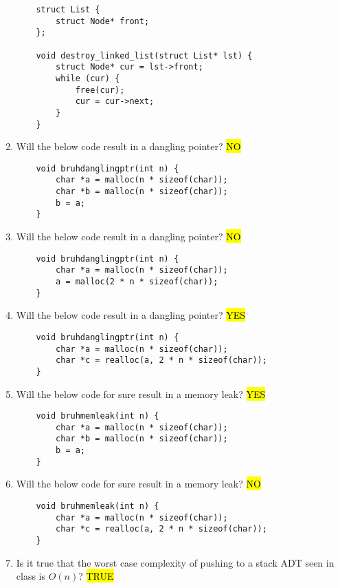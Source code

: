 \documentclass{article}
\begin{document}
\begin{enumerate}
\begin{lstlisting}
    struct List {
        struct Node* front;
    };

    void destroy_linked_list(struct List* lst) {
        struct Node* cur = lst->front;
        while (cur) {
            free(cur);
            cur = cur->next;
        }
    }
    \end{lstlisting}
    \vspace{16mm}
    \item Will the below code result in a dangling pointer? \hl{NO}
    \begin{lstlisting}
    void bruhdanglingptr(int n) {
        char *a = malloc(n * sizeof(char));
        char *b = malloc(n * sizeof(char));
        b = a;
    }
    \end{lstlisting}

    \item Will the below code result in a dangling pointer? \hl{NO}
    \begin{lstlisting}
    void bruhdanglingptr(int n) {
        char *a = malloc(n * sizeof(char));
        a = malloc(2 * n * sizeof(char));
    }
    \end{lstlisting}
    
    \item Will the below code result in a dangling pointer? \hl{YES}
    \begin{lstlisting}
    void bruhdanglingptr(int n) {
        char *a = malloc(n * sizeof(char));
        char *c = realloc(a, 2 * n * sizeof(char));
    }
    \end{lstlisting}
    
    \item Will the below code for sure result in a memory leak? \hl{YES}
    \begin{lstlisting}
    void bruhmemleak(int n) {
        char *a = malloc(n * sizeof(char));
        char *b = malloc(n * sizeof(char));
        b = a;
    }
    \end{lstlisting}
    
    \item Will the below code for sure result in a memory leak? \hl{NO}
    \begin{lstlisting}
    void bruhmemleak(int n) {
        char *a = malloc(n * sizeof(char));
        char *c = realloc(a, 2 * n * sizeof(char));
    }
    \end{lstlisting}

    \item Is it true that the worst case complexity of pushing to a stack ADT seen in class is \( O(n) \)? \hl{TRUE}
    

\end{enumerate}
\end{document}
